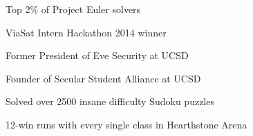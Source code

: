 


\vspace{0.3cm}
\begin{cvitems}
\begin{small}
\item{Top 2\% of Project Euler solvers}
\item{ViaSat Intern Hackathon 2014 winner}
\item{Former President of Eve Security at UCSD}
\item{Founder of Secular Student Alliance at UCSD}
\item{Solved over 2500 insane difficulty Sudoku puzzles}
\item{12-win runs with every single class in Hearthstone Arena}
\end{small}
\end{cvitems}
